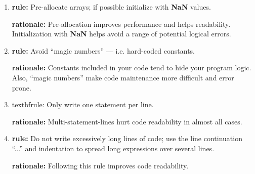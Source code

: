 \documentclass{tufte-book}
\begin{document}
\begin{enumerate}
\item \textbf{rule:} Pre-allocate arrays; if possible initialize with \textbf{NaN} values.

\textbf{rationale:} Pre-allocation improves performance and helps readability. Initialization with \textbf{NaN} helps avoid a range of potential logical errors.

\item \textbf{rule:} Avoid ``magic numbers'' --- i.e. hard-coded constants.

\textbf{rationale:} Constants included in your code tend to hide your program logic. Also, ``magic numbers'' make code maintenance more difficult and error prone.

\item textbf{rule:} Only write one statement per line.

\textbf{rationale:} Multi-statement-lines hurt code readability in almost all cases.

\item \textbf{rule:} Do not write excessively long lines of code; use the line continuation ``...'' and indentation to spread long expressions over several lines.

\textbf{rationale:} Following this rule improves code readability.
\end{enumerate}













\printindex
\end{document}
